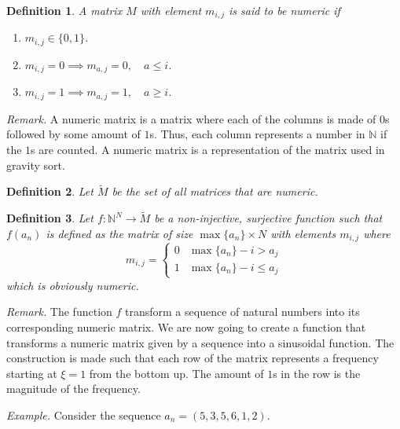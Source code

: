 \documentclass{article}
\newtheorem{definition}{Definition}[section]
\begin{document}
\begin{definition}
    A matrix \(M\) with element \(m_{i,j}\) is said to be \textit{numeric} if
    \begin{enumerate}
        \item \(m_{i,j} \in \{0,1\}\).
        \item \(m_{i,j} = 0 \implies m_{a,j} = 0, \quad a \leq i \).
        \item \(m_{i,j} = 1 \implies m_{a,j} = 1, \quad a \geq i \).
    \end{enumerate}
\end{definition}

\textit{Remark.} A numeric matrix is a matrix where each of the columns is made of \(0\)s followed by
some amount of \(1\)s. Thus, each column represents a number in \(\mathbb{N}\)
if the \(1\)s are counted.
A numeric matrix is a representation of the matrix used in gravity sort.

\begin{definition}
    Let \(\tilde{M}\) be the set of all matrices that are numeric.
\end{definition}

\begin{definition}
    Let \(f\colon {\mathbb{N}}^N \to \tilde{M}\) be a non-injective, surjective function
    such that \(f(a_n)\) is defined as the matrix of size \(\max\{a_n\} \times N\)
    with elements \(m_{i,j}\) where
    \[
        m_{i,j} =
        \begin{cases}
            0 & \max\{a_n\} - i > a_j \\
            1 & \max\{a_n\} - i \leq a_j
        \end{cases}
    \]
    which is obviously numeric.
\end{definition}

\textit{Remark.} The function \(f\) transform a sequence of natural numbers into its corresponding
numeric matrix. We are now going to create a function that transforms 
a numeric matrix given by a sequence into a sinusoidal function.
The construction is made such that each row of the matrix represents a frequency
starting at \(\xi=1\) from the bottom up. The amount of \(1\)s in the row
is the magnitude of the frequency.

\textit{Example.} Consider the sequence \(a_n = (5,3,5,6,1,2)\).
\end{document}
